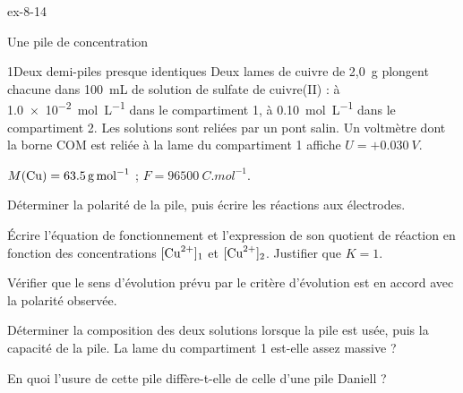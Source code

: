 \begin{blocLivre}{ex-8-14}
\begin{exercice}[3]{Une pile de concentration}
\begin{docu}{1}{Deux demi-piles presque identiques}
Deux lames de cuivre de 2,0~g plongent chacune dans 100~mL de solution de sulfate de cuivre(II) : à
\qty{1,0e-2}{mol.L^{-1}} dans le compartiment 1, à \qty{0,10}{mol.L^{-1}} dans le compartiment 2. Les solutions sont
reliées par un pont salin. Un voltmètre dont la borne COM est reliée à la lame du compartiment 1 affiche
$U=+\qty{0,030}{V}$.
\end{docu}
\begin{donnees}
$M(\ce{Cu})=\qty{63,5}{g.mol^{-1}}$ ; $F=\qty{96500}{C.mol^{-1}}$.
\end{donnees}
\begin{questions}
\item Déterminer la polarité de la pile, puis écrire les réactions aux électrodes.
\item Écrire l'équation de fonctionnement et l'expression de son quotient de réaction en fonction des concentrations
$[\ce{Cu^2+}]_1$ et $[\ce{Cu^2+}]_2$. Justifier que $K=1$.
\item Vérifier que le sens d'évolution prévu par le critère d'évolution est en accord avec la polarité observée.
\item \initiative Déterminer la composition des deux solutions lorsque la pile est usée, puis la capacité de la pile.
La lame du compartiment 1 est-elle assez massive ?
\item En quoi l'usure de cette pile diffère-t-elle de celle d'une pile Daniell ?
\end{questions}
\end{exercice}
\end{blocLivre}
